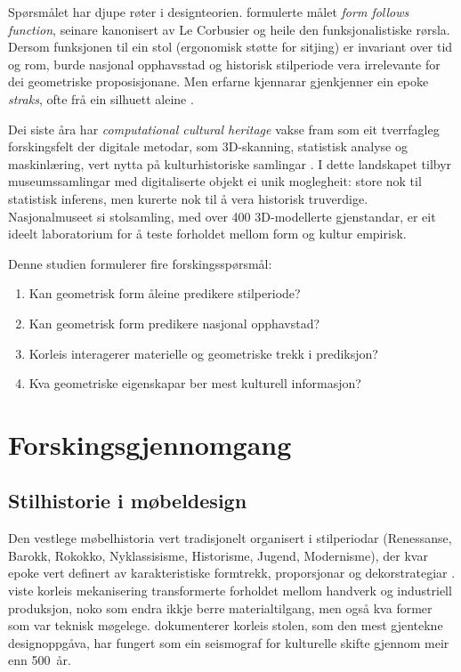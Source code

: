\documentclass[12pt,a4paper]{article}
\begin{document}
Sp\o{}rsm\aa{}let har djupe r\o{}ter i designteorien. \citet{sullivan1896} formulerte m\aa{}let \emph{form follows function}, seinare kanonisert av Le Corbusier \citep{corbusier1923} og heile den funksjonalistiske r\o{}rsla. Dersom funksjonen til ein stol (ergonomisk st\o{}tte for sitjing) er invariant over tid og rom, burde nasjonal opphavsstad og historisk stilperiode vera irrelevante for dei geometriske proposisjonane. Men erfarne kjennarar gjenkjenner ein epoke \emph{straks}, ofte fr\aa{} ein silhuett aleine \citep{luciesmith1979, fiell2005}.

Dei siste \aa{}ra har \emph{computational cultural heritage} vakse fram som eit tverrfagleg forskingsfelt der digitale metodar, som 3D-skanning, statistisk analyse og maskinl\ae{}ring, vert nytta p\aa{} kulturhistoriske samlingar \citep{santos2017, manovich2020}. I dette landskapet tilbyr museumssamlingar med digitaliserte objekt ei unik moglegheit: store nok til statistisk inferens, men kurerte nok til \aa{} vera historisk truverdige. Nasjonalmuseet si stolsamling, med over 400 3D-modellerte gjenstandar, er eit ideelt laboratorium for \aa{} teste forholdet mellom form og kultur empirisk.

Denne studien formulerer fire forskingssp\o{}rsm\aa{}l:
\begin{enumerate}
    \item Kan geometrisk form \aa{}leine predikere stilperiode?
    \item Kan geometrisk form predikere nasjonal opphavstad?
    \item Korleis interagerer materielle og geometriske trekk i prediksjon?
    \item Kva geometriske eigenskapar ber mest kulturell informasjon?
\end{enumerate}

\section{Forskingsgjennomgang}

\subsection{Stilhistorie i m\o{}beldesign}

Den vestlege m\o{}belhistoria vert tradisjonelt organisert i stilperiodar (Renessanse, Barokk, Rokokko, Nyklassisisme, Historisme, Jugend, Modernisme), der kvar epoke vert definert av karakteristiske formtrekk, proporsjonar og dekorstrategiar \citep{luciesmith1979}. \citet{giedion1948} viste korleis mekanisering transformerte forholdet mellom handverk og industriell produksjon, noko som endra ikkje berre materialtilgang, men ogs\aa{} kva former som var teknisk m\o{}gelege. \citet{fiell2005} dokumenterer korleis stolen, som den mest gjentekne designoppg\aa{}va, har fungert som ein seismograf for kulturelle skifte gjennom meir enn 500~\aa{}r.
\end{document}
